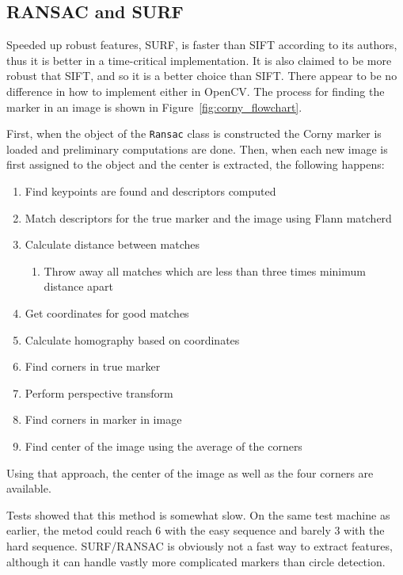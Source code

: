 \subsection{RANSAC and \textsc{SURF}}

Speeded up robust features, \textsc{SURF}, is faster than \textsc{SIFT} according to its authors\cite{WikiSURF}, thus it is better in a time-critical implementation.
It is also claimed to be more robust that \textsc{SIFT}, and so it is a better choice than SIFT.\@
There appear to be no difference in how to implement either in OpenCV.\@
The process for finding the marker in an image is shown in Figure~\vref{fig:corny_flowchart}.

First, when the object of the \verb|Ransac| class is constructed the Corny marker is loaded and preliminary computations are done.
Then, when each new image is first assigned to the object and the center is extracted, the following happens:
\begin{enumerate}
    \item Find keypoints are found and descriptors computed
    \item Match descriptors for the true marker and the image using Flann matcherd
    \item Calculate distance between matches
    \begin{enumerate}
    \item Throw away all matches which are less than three times minimum distance apart
    \end{enumerate}
    \item Get coordinates for good matches
    \item Calculate homography based on coordinates
    \item Find corners in true marker
    \item Perform perspective transform
    \item Find corners in marker in image
    \item Find center of the image using the average of the corners
\end{enumerate}

Using that approach, the center of the image as well as the four corners are available.

Tests showed that this method is somewhat slow. On the same test machine as earlier,
the metod could reach \SI{6}{\fps} with the easy sequence and barely \SI{3}{\fps} with the hard sequence.
SURF/RANSAC is obviously not a fast way to extract features, although it can handle vastly more complicated markers than circle detection.

